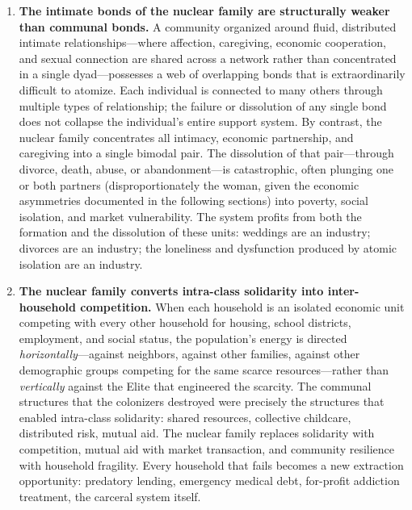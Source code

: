 \documentclass[12pt,openany]{book}
\begin{document}
\begin{enumerate}
    \item \textbf{The intimate bonds of the nuclear family are structurally weaker than communal bonds.} A community organized around fluid, distributed intimate relationships---where affection, caregiving, economic cooperation, and sexual connection are shared across a network rather than concentrated in a single dyad---possesses a web of overlapping bonds that is extraordinarily difficult to atomize. Each individual is connected to many others through multiple types of relationship; the failure or dissolution of any single bond does not collapse the individual's entire support system. By contrast, the nuclear family concentrates all intimacy, economic partnership, and caregiving into a single bimodal pair. The dissolution of that pair---through divorce, death, abuse, or abandonment---is catastrophic, often plunging one or both partners (disproportionately the woman, given the economic asymmetries documented in the following sections) into poverty, social isolation, and market vulnerability. The system profits from both the formation and the dissolution of these units: weddings are an industry; divorces are an industry; the loneliness and dysfunction produced by atomic isolation are an industry.

    \item \textbf{The nuclear family converts intra-class solidarity into inter-household competition.} When each household is an isolated economic unit competing with every other household for housing, school districts, employment, and social status, the population's energy is directed \textit{horizontally}---against neighbors, against other families, against other demographic groups competing for the same scarce resources---rather than \textit{vertically} against the Elite that engineered the scarcity. The communal structures that the colonizers destroyed were precisely the structures that enabled intra-class solidarity: shared resources, collective childcare, distributed risk, mutual aid. The nuclear family replaces solidarity with competition, mutual aid with market transaction, and community resilience with household fragility. Every household that fails becomes a new extraction opportunity: predatory lending, emergency medical debt, for-profit addiction treatment, the carceral system itself.
\end{enumerate}
\end{document}
